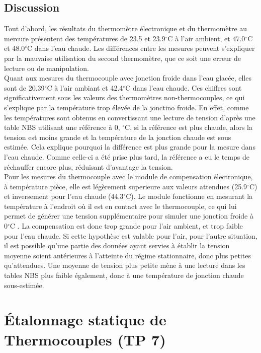 \documentclass[11pt,twoside]{article}
\numberwithin{figure}{section}
\begin{document}
\subsection{Discussion}
Tout d’abord, les résultats du thermomètre électronique et du thermomètre au mercure présentent des températures de 23.5 et 23.9\(^\circ\)C à l'air ambient, et 47.0\(^\circ\)C et 48.0\(^\circ\)C dans l'eau chaude. Les différences entre les mesures peuvent s'expliquer par la mauvaise utilisation du second thermomètre, que ce soit une erreur de lecture ou de manipulation.\\
Quant aux mesures du thermocouple avec jonction froide dans l'eau glacée, elles sont de 20.39\(^\circ\)C à l'air ambiant et 42.4\(^\circ\)C dans l'eau chaude. Ces chiffres sont significativement sous les valeurs des thermomètres non-thermocouples, ce qui s'explique par la température trop élevée de la jonctino froide. En effet, comme les températures sont obtenus en convertissant une lecture de tension d'après une table NBS utilisant une référence à 0, \(^\circ\)C, si la référence est plus chaude, alors la tension est moins grande et la température de la jonction chaude est sous estimée. Cela explique pourquoi la différence est plus grande pour la mesure dans l'eau chaude. Comme celle-ci a été prise plus tard, la référence a eu le temps de réchauffer encore plus, réduisant d'avantage la tension.\\
Pour les mesures du thermocouple avec le module de compensation électronique, à température pièce, elle est légèrement superieure aux valeurs attendues (25.9\(^\circ\)C) et inversement pour l'eau chaude (44.3\(^\circ\)C). Le module fonctionne en mesurant la température à l'endroit où il est en contact avec le thermocouple, ce qui lui permet de générer une tension supplémentaire pour simuler une jonction froide à 0\(^\circ\)C \cite{Atmaram2014CJC}. La compensation est donc trop grande pour l'air ambient, et trop faible pour l'eau chaude. Si cette hypothèse est valable pour l'air, pour l'autre situation, il est possible qu'une partie des données ayant servies à établir la tension moyenne soient antérieures à l'atteinte du régime stationnaire, donc plus petites qu'attendues. Une moyenne de tension plus petite mène à une lecture dans les tables NBS plus faible également, donc à une température de jonction chaude sous-estimée. 

\newpage{}
\section{Étalonnage statique de Thermocouples (TP 7)}
\thispagestyle{empty}
\end{document}
